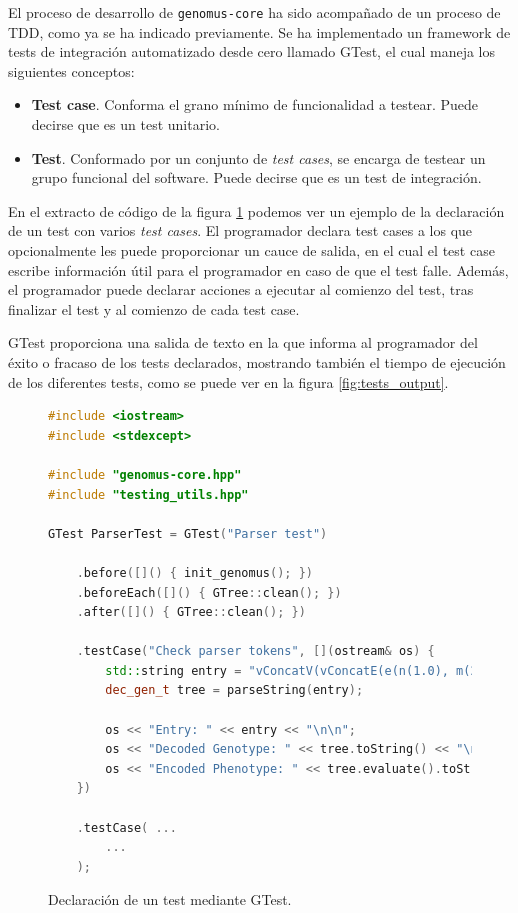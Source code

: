 El proceso de desarrollo de \verb|genomus-core| ha sido acompañado de un proceso de TDD, como ya se ha indicado previamente. Se ha implementado un framework de tests de integración automatizado desde cero llamado GTest, el cual maneja los siguientes conceptos:

\begin{itemize}
    \item \textbf{Test case}. Conforma el grano mínimo de funcionalidad a testear. Puede decirse que es un test unitario.
    
    \item \textbf{Test}. Conformado por un conjunto de \textit{test cases}, se encarga de testear un grupo funcional del software. Puede decirse que es un test de integración.
\end{itemize}

En el extracto de código de la figura \ref{fig:gtest} podemos ver un ejemplo de la declaración de un test con varios \textit{test cases}. El programador declara test cases a los que opcionalmente les puede proporcionar un cauce de salida, en el cual el test case escribe información útil para el programador en caso de que el test falle. Además, el programador puede declarar acciones a ejecutar al comienzo del test, tras finalizar el test y al comienzo de cada test case.

GTest proporciona una salida de texto en la que informa al programador del éxito o fracaso de los tests declarados, mostrando también el tiempo de ejecución de los diferentes tests, como se puede ver en la figura \ref{fig:tests_output}.

\begin{figure}
    \centering
    \begin{lstlisting}[language=cpp]
#include <iostream>
#include <stdexcept>

#include "genomus-core.hpp"
#include "testing_utils.hpp"

GTest ParserTest = GTest("Parser test")

    .before([]() { init_genomus(); })
    .beforeEach([]() { GTree::clean(); })
    .after([]() { GTree::clean(); })

    .testCase("Check parser tokens", [](ostream& os) {
        std::string entry = "vConcatV(vConcatE(e(n(1.0), m(2.0), a(3.0), i(1)), eAutoref(0)), vConcatE(eAutoref(1), eAutoref(2)))";
        dec_gen_t tree = parseString(entry);

        os << "Entry: " << entry << "\n\n";
        os << "Decoded Genotype: " << tree.toString() << "\n\n";
        os << "Encoded Phenotype: " << tree.evaluate().toString() << "\n\n";
    })

    .testCase( ... 
        ...
    );
\end{lstlisting}
    \caption{Declaración de un test mediante GTest.}
    \label{fig:gtest}
\end{figure}

